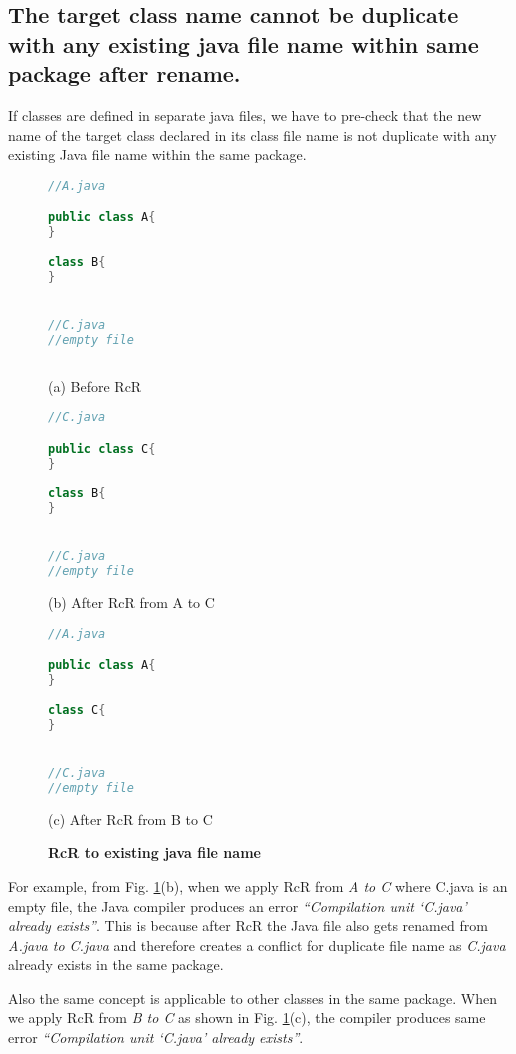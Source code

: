 \subsection{The target class name cannot be duplicate with any existing java file name within same package after rename.}

If classes are defined in separate java files, we have to pre-check that the new name of the target class declared in its class file name is not duplicate with any existing Java file name within the same package. 

\begin{figure}[th]
\centering
\begin{minipage}[t]{0.45\linewidth}
\begin{lstlisting}[language=java, basicstyle=\scriptsize\ttfamily,frame=single]
//A.java

public class A{
}
	
class B{
}


//C.java
//empty file
 
\end{lstlisting}
\centering(a) Before RcR
\end{minipage}
\hfill
\begin{minipage}[t]{0.45\linewidth}
\begin{lstlisting}[language=java, basicstyle=\scriptsize\ttfamily,frame=single]
//C.java

public class C{
}
	
class B{
}


//C.java
//empty file

\end{lstlisting}
\centering(b) After RcR from A to C
\end{minipage}

\centering
\begin{minipage}[t]{0.45\linewidth}
\begin{lstlisting}[language=java, basicstyle=\scriptsize\ttfamily,frame=single]
//A.java

public class A{
}
	
class C{
}


//C.java
//empty file

\end{lstlisting}
\centering(c) After RcR from B to C
\end{minipage}
\caption{\textbf{RcR to existing java file name}}
\label{figure:classFileName}
\end{figure}

For example, from Fig. \ref{figure:classFileName}(b), when we apply RcR from \emph{A to C} where C.java is an empty file, the Java compiler produces an error \textit{``Compilation unit `C.java' already exists''}. This is because after RcR the Java file also gets renamed from \emph{A.java to C.java} and therefore creates a conflict for duplicate file name as \emph{C.java} already exists in the same package. 

Also the same concept is applicable to other classes in the same package. When we apply RcR from \emph{B to C} as shown in Fig. \ref{figure:classFileName}(c), the compiler produces same error \textit{``Compilation unit `C.java' already exists''}.  



